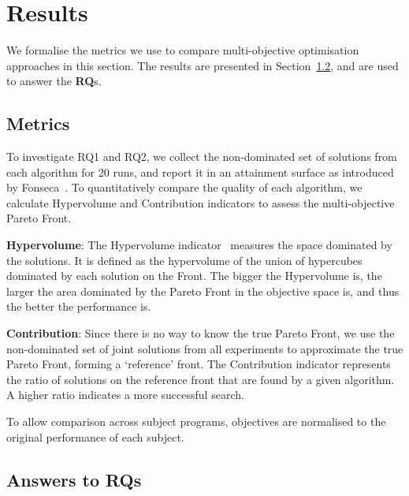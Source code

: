 
\section{Results}
\label{sec_results}


We formalise the metrics we use to compare multi-objective optimisation approaches in this section.
The results are presented in Section~\ref{sec_answers}, and are used to answer the \textbf{RQ}s.

\subsection{Metrics}
\label{sec_matrics}

To investigate RQ1 and RQ2, we collect the non-dominated set of solutions from each algorithm for 20 runs, and report it in an attainment surface as introduced by Fonseca~\cite{attainment_surface:1996}. To quantitatively compare the quality of each algorithm, we calculate Hypervolume and Contribution indicators to assess the multi-objective Pareto Front.

\textbf{Hypervolume}: The Hypervolume indicator~\cite{797969} measures the space dominated by the solutions. It is defined as the hypervolume of the union of hypercubes dominated by each solution on the Front. The bigger the Hypervolume is, the larger the area dominated by the Pareto Front in the objective space is, and thus the better the performance is.

\textbf{Contribution}: Since there is no way to know the true Pareto Front, we use the non-dominated set of joint solutions from all experiments to approximate the true Pareto Front, forming a `reference' front. The Contribution indicator represents the ratio of solutions on the reference front that are found by a given algorithm. A higher ratio indicates a more successful search. 

To allow comparison across subject programs, objectives are normalised to the original performance of each subject.


\subsection{Answers to RQs}
\label{sec_answers}

\newcommand{\shallow}{Sha}
\newcommand{\all}{All}
\newcommand{\randomsearch}{Rand}
\newcommand{\nsgaii}{NSGA}
\newcommand{\sr}{\emph{\shallow\randomsearch}}
\newcommand{\sn}{\emph{\shallow\nsgaii}}
\newcommand{\dr}{\emph{\all\randomsearch}}
\newcommand{\dn}{\emph{\all\nsgaii}}

